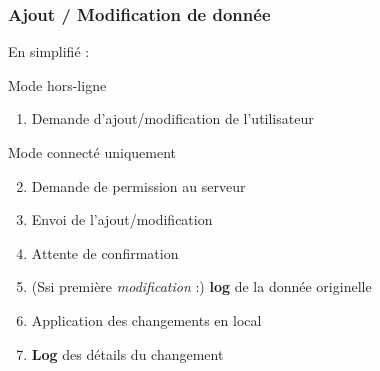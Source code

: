 \begin{frame}
\frametitle{Ajout / Modification de donnée}

En simplifié :

\begin{block}{Mode hors-ligne}
\begin{enumerate}
    \item Demande d'ajout/modification de l'utilisateur
\end{enumerate}
\vspace{-1em}
\hspace*{.05\linewidth}\begin{minipage}{.9\linewidth}
\begin{exampleblock}{Mode connecté uniquement}
\begin{enumerate}
    \setcounter{enumi}{1}
    \item Demande de permission au serveur
    \item Envoi de l'ajout/modification
    \item Attente de confirmation
\end{enumerate}
\end{exampleblock}
\end{minipage}
\begin{enumerate}
\setcounter{enumi}{4}
    \item (Ssi première \emph{modification} :) \textbf{log} de la donnée originelle
    \item Application des changements en local
    \item \textbf{Log} des détails du changement
\end{enumerate}
\end{block}


\end{frame} %

